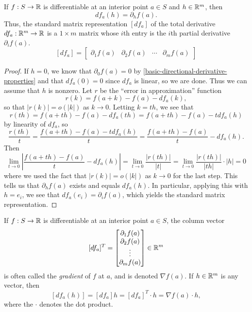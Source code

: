 \begin{proposition} \label{differentiable-implies-directionals}
	If $f : S \to \mathbb{R}$ is differentiable at an interior point $a \in S$ and $h \in \mathbb{R}^m$, then \[ df_a(h) = \partial_h f(a). \]
	Thus, the standard matrix representation $[df_a]$ of the total derivative $df_a : \mathbb{R}^m \to \mathbb{R}$ is a $1 \times m$ matrix whose $i$th entry is the $i$th partial derivative $\partial_i f(a)$. 
	\[ [df_a] = \begin{bmatrix} \partial_1 f(a) & \partial_2 f(a) & \dotsb & \partial_m f(a) \end{bmatrix} \]
\end{proposition}

\begin{proof}
	If $h = 0$, we know that $\partial_0 f(a) = 0$ by \cref{basic-directional-derivative-properties} and that $df_a(0) = 0$ since $df_a$ is linear, so we are done. Thus we can assume that $h$ is nonzero. Let $r$ be the ``error in approximation'' function
	\[ r(k) = f(a+k) - f(a) - df_a(k), \]
	so that $|r(k)| = o(|k|)$ as $k \to 0$. Letting $k = th$, we see that
	\[ r(th) = f(a+th) - f(a) - df_a(th) = f(a+th) - f(a) - t df_a(h) \]
	by linearity of $df_a$, so
	\[ \frac{r(th)}{t} = \frac{f(a+th) - f(a) - tdf_a(h)}{t} = \frac{f(a+th) - f(a)}{t} - df_a(h). \]
	Then 
	\[\lim_{t \to 0} \left| \frac{f(a+th) - f(a)}{t} - df_a(h) \right| 
	= \lim_{t \to 0} \frac{|r(th)|}{|t|} = \lim_{t \to 0} \frac{|r(th)|}{|th|} \cdot |h| = 0 \]
	where we used the fact that $|r(k)| = o(|k|)$ as $k \to 0$ for the last step. This tells us that $\partial_h f(a)$ exists and equals $df_a(h)$. In particular, applying this with $h = e_i$, we see that $df_a(e_i) = \partial_i f(a)$, which yields the standard matrix representation.  
\end{proof}

\begin{remark} \label{gradient}
	If $f : S \to \mathbb{R}$ is differentiable at an interior point $a \in S$, the column vector \[ [df_a]^T = \begin{bmatrix} \partial_1 f(a) \\ \partial_2 f(a) \\ \vdots \\ \partial_m f(a) \end{bmatrix} \in \mathbb{R}^m \]
	is often called the \emph{gradient}  of $f$ at $a$, and is denoted $\nabla f(a)$. If $h \in \mathbb{R}^m$ is any vector, then 
	\[ [df_a(h)] = [df_a]h = [df_a]^T \cdot h = \nabla f(a) \cdot h, \]
	where the $\cdot$ denotes the dot product. 
\end{remark}

